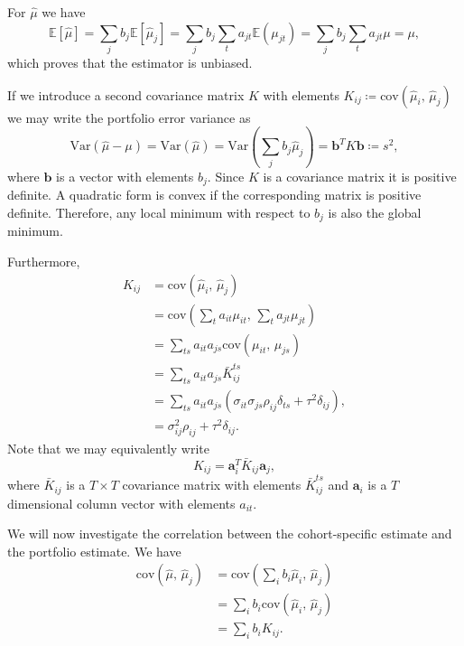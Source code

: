 \documentclass[11pt]{article}
\theoremstyle{definition}
\begin{document}
For $\hat\mu$ we have
\begin{equation*}
    \mathds{E}[\hat\mu] = \sum_j b_j \mathds{E}[\hat\mu_j] = \sum_j b_j \sum_t a_{jt} \mathds{E}(\mu_{jt}) = \sum_j b_j \sum_t a_{jt} \mu = \mu,
\end{equation*}
which proves that the estimator is unbiased.

If we introduce a second covariance matrix $K$ with elements $ K_{ij} \coloneqq \text{cov}(\hat\mu_i,\, \hat\mu_j)$ we may write the portfolio error variance as
\begin{equation}\label{eq:s2}
    \text{Var}(\hat\mu - \mu) = \text{Var}(\hat\mu) = \text{Var}(\sum_j b_j \hat\mu_j) = \bm b^T  K \bm b \coloneqq s^2,
\end{equation}
where $\bm b$ is a vector with elements $b_j$. Since $ K$ is a covariance matrix it is positive definite. A quadratic form is convex if the corresponding matrix is positive definite. Therefore, any local minimum with respect to $b_j$ is also the global minimum.

Furthermore,
\begin{equation}\label{eq:K_bar}
\begin{aligned}
     K_{ij} &= \text{cov}(\hat\mu_i,\, \hat\mu_j) \\
    &= \text{cov}\left(\sum_t a_{it}\mu_{it},\, \sum_t a_{jt}\mu_{jt}\right) \\
    &= \sum_{ts} a_{it}a_{js}\text{cov}(\mu_{it},\, \mu_{js}) \\
    &= \sum_{ts} a_{it}a_{js}\bar K_{ij}^{ts} \\
    &= \sum_{ts} a_{it}a_{js}(\sigma_{it}\sigma_{js}\rho_{ij}\delta_{ts} + \tau^2\delta_{ij}), \\
    &= \sigma_{ij}^2\rho_{ij} + \tau^2\delta_{ij}.
\end{aligned}    
\end{equation}
Note that we may equivalently write
\begin{equation*}
     K_{ij} = \bm a_i^T \bar K_{ij} \bm a_j,
\end{equation*}
where $\bar K_{ij}$ is a $T\times T$ covariance matrix with elements $\bar K_{ij}^{ts}$ and $\bm a_i$ is a $T$ dimensional column vector with elements $a_{it}$.

We will now investigate the correlation between the cohort-specific estimate and the portfolio estimate. We have
\begin{equation*}
    \begin{aligned}
    \text{cov}(\hat\mu,\, \hat\mu_j) &= \text{cov}(\sum_i b_i \hat\mu_i,\, \hat\mu_j) \\
    &= \sum_i b_i \text{cov}(\hat\mu_i,\, \hat\mu_j) \\
    &= \sum_i b_i  K_{ij}.
    \end{aligned}
\end{equation*}
\end{document}
